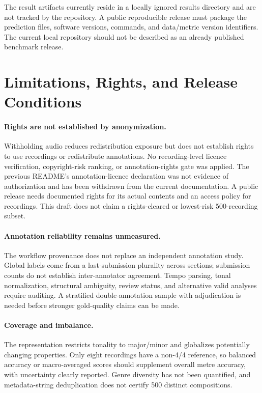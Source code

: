 \documentclass[11pt,a4paper]{article}
\begin{document}
The result artifacts currently reside in a locally ignored results directory and are not tracked by the repository. A public reproducible release must package the prediction files, software versions, commands, and data/metric version identifiers. The current local repository should not be described as an already published benchmark release.

\section{Limitations, Rights, and Release Conditions}
\label{sec:limitations}
\paragraph{Rights are not established by anonymization.}
Withholding audio reduces redistribution exposure but does not establish rights to use recordings or redistribute annotations. No recording-level licence verification, copyright-risk ranking, or annotation-rights gate was applied. The previous README's annotation-licence declaration was not evidence of authorization and has been withdrawn from the current documentation. A public release needs documented rights for its actual contents and an access policy for recordings. This draft does not claim a rights-cleared or lowest-risk 500-recording subset.

\paragraph{Annotation reliability remains unmeasured.}
The workflow provenance does not replace an independent annotation study. Global labels come from a last-submission plurality across sections; submission counts do not establish inter-annotator agreement. Tempo parsing, tonal normalization, structural ambiguity, review status, and alternative valid analyses require auditing. A stratified double-annotation sample with adjudication is needed before stronger gold-quality claims can be made.

\paragraph{Coverage and imbalance.}
The representation restricts tonality to major/minor and globalizes potentially changing properties. Only eight recordings have a non-4/4 reference, so balanced accuracy or macro-averaged scores should supplement overall metre accuracy, with uncertainty clearly reported. Genre diversity has not been quantified, and metadata-string deduplication does not certify 500 distinct compositions.
\end{document}
